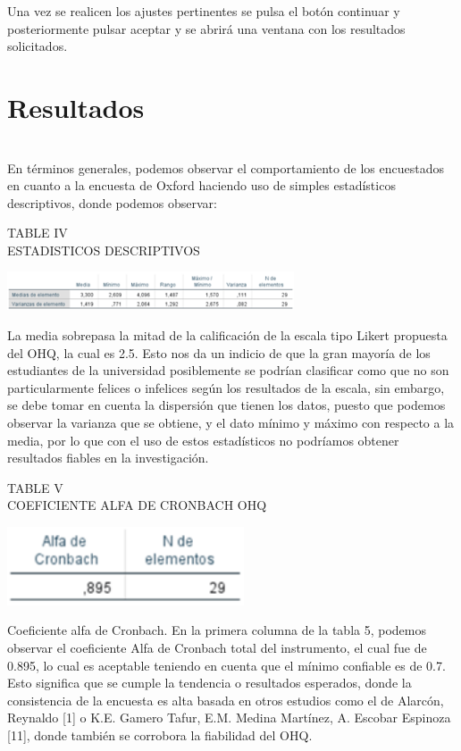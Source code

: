 \documentclass[conference]{IEEEtran}
\begin{document}
   Una vez se realicen los ajustes pertinentes se pulsa el botón continuar y posteriormente pulsar aceptar y se abrirá una ventana con los resultados solicitados.\\

\section{Resultados}\\
 En términos generales, podemos observar el comportamiento de los encuestados en cuanto a la encuesta de Oxford haciendo uso de simples estadísticos descriptivos, donde podemos observar: \\
 \begin{center}
\caption{TABLE IV\\
ESTADISTICOS DESCRIPTIVOS}
\includegraphics[width=8.5cm]{imagenes/tabla5.png}
\end{center}
La media sobrepasa la mitad de la calificación de la escala tipo Likert propuesta del OHQ, la cual es 2.5. Esto nos da un indicio de que la gran mayoría de los estudiantes de la universidad posiblemente se podrían clasificar como que no son particularmente felices o infelices según los resultados de la escala, sin embargo, se debe tomar en cuenta la dispersión que tienen los datos, puesto que podemos observar la varianza que se obtiene, y el dato mínimo y máximo con respecto a la media, por lo que con el uso de estos estadísticos no podríamos obtener resultados fiables en la investigación.\\
\begin{center}
\caption{TABLE V\\
COEFICIENTE ALFA DE CRONBACH OHQ}
\includegraphics[width=7cm]{imagenes/tabla51.png}
\end{center}
Coeficiente alfa de Cronbach.  En la primera columna de la tabla 5, podemos observar el coeficiente Alfa de Cronbach total del instrumento, el cual fue de 0.895, lo cual es aceptable teniendo en cuenta que el mínimo confiable es de 0.7. Esto significa que se cumple la tendencia o resultados esperados, donde la consistencia de la encuesta es alta basada en otros estudios como el de Alarcón, Reynaldo [1] o  K.E. Gamero Tafur, E.M. Medina Martínez, A. Escobar Espinoza [11], donde también se corrobora la fiabilidad del OHQ.\\
\end{document}
